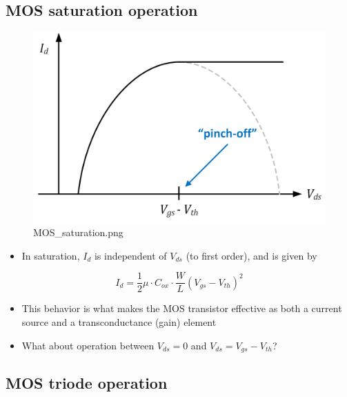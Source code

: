 \documentclass[11pt]{article}
\providecommand{\tightlist}{%
      \setlength{\itemsep}{0pt}\setlength{\parskip}{0pt}}
\begin{document}
    \hypertarget{mos-saturation-operation}{%
\subsection{MOS saturation operation}\label{mos-saturation-operation}}

    \begin{figure}
\centering
\includegraphics{MOS_saturation.png}
\caption{MOS\_saturation.png}
\end{figure}

    \begin{itemize}
\tightlist
\item
  In saturation, \(I_{d}\) is independent of \(V_{ds}\) (to first
  order), and is given by
\end{itemize}

\begin{equation}
I_d = \dfrac{1}{2}\mu\cdot C_{ox} \cdot \dfrac{W}{L}(V_{gs}-V_{th})^2
\end{equation}

\begin{itemize}
\tightlist
\item
  This behavior is what makes the MOS transistor effective as both a
  current source and a transconductance (gain) element
\item
  What about operation between \(V_{ds}=0\) and
  \(V_{ds}=V_{gs}-V_{th}\)?
\end{itemize}

    \hypertarget{mos-triode-operation}{%
\subsection{MOS triode operation}\label{mos-triode-operation}}
\end{document}
